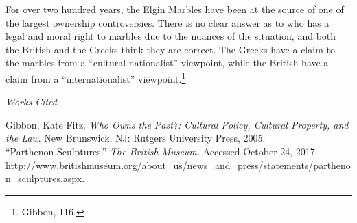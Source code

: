 \documentclass[11pt]{article}
\newenvironment{bib}[1]
  {\begin{list}
          {}
          {\setlength{\itemindent}{-#1}
           \setlength{\leftmargin}{#1}
           \setlength{\itemsep}{0pt}
           \setlength{\parsep}{\parskip}
           \setlength{\topsep}{\parskip}
           }
    \setlength{\parindent}{-#1}
    \item[]
  }
  {\end{list}}
\begin{document}
For over two hundred years, the Elgin Marbles have been at the source of one of the largest ownership controversies. There is no clear answer as to who has a legal and moral right to marbles due to the nuances of the situation, and both the British and the Greeks think they are correct. The Greeks have a claim to the marbles from a ``cultural nationalist'' viewpoint, while the British have a claim from a ``internationalist'' viewpoint.\footnote{Gibbon, 116.}

\newpage
\singlespacing
\begin{center}
{\large\textit{Works Cited}}
\end{center}

\begin{bib}{2em}
Gibbon, Kate Fitz. \textit{Who Owns the Past?: Cultural Policy, Cultural Property, and the Law}. New Brunswick, NJ: Rutgers University Press, 2005. \\

``Parthenon Sculptures.'' \textit{The British Museum.} Accessed October 24, 2017. \url{http://www.britishmuseum.org/about_us/news_and_press/statements/parthenon_sculptures.aspx}. \\
\end{bib}
\end{document}
